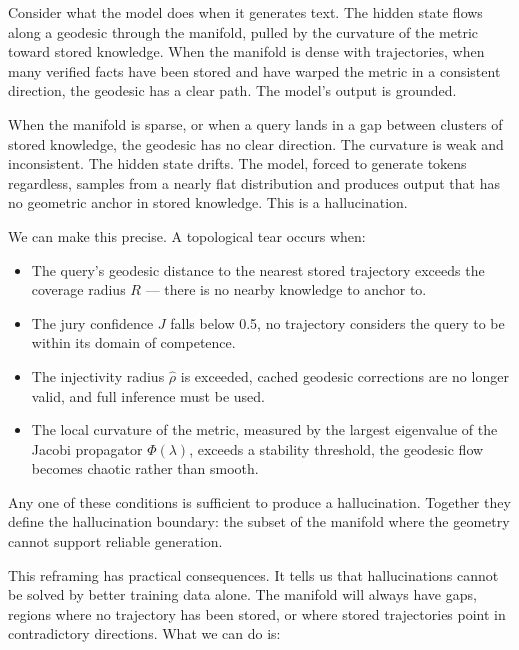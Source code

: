\documentclass[11pt]{article}
\begin{document}
Consider what the model does when it generates text. The hidden state flows
along a geodesic through the manifold, pulled by the curvature of the metric
toward stored knowledge. When the manifold is dense with trajectories, when many verified facts have been stored and have warped the metric in a
consistent direction, the geodesic has a clear path. The model's output is
grounded.

When the manifold is sparse, or when a query lands in a gap between clusters
of stored knowledge, the geodesic has no clear direction. The curvature is
weak and inconsistent. The hidden state drifts. The model, forced to generate
tokens regardless, samples from a nearly flat distribution and produces
output that has no geometric anchor in stored knowledge. This is a
hallucination.

We can make this precise. A topological tear occurs when:

\begin{itemize}[nosep]
\item The query's geodesic distance to the nearest stored trajectory exceeds
      the coverage radius $R$ --- there is no nearby knowledge to anchor to.
\item The jury confidence $J$ falls below 0.5, no trajectory considers
      the query to be within its domain of competence.
\item The injectivity radius $\hat\rho$ is exceeded, cached geodesic
      corrections are no longer valid, and full inference must be used.
\item The local curvature of the metric, measured by the largest eigenvalue
      of the Jacobi propagator $\Phi(\lambda)$, exceeds a stability
      threshold, the geodesic flow becomes chaotic rather than smooth.
\end{itemize}

Any one of these conditions is sufficient to produce a hallucination.
Together they define the hallucination boundary: the subset of the
manifold where the geometry cannot support reliable generation.

This reframing has practical consequences. It tells us that hallucinations
cannot be solved by better training data alone. The manifold will always have
gaps, regions where no trajectory has been stored, or where stored
trajectories point in contradictory directions. What we can do is:
\end{document}
